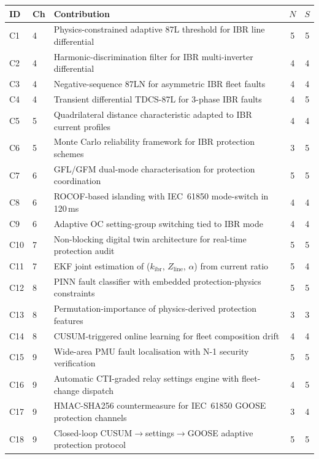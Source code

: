 \documentclass[11pt,a4paper]{article}
\begin{document}
\begin{center}
\small
\begin{tabular}{@{}llp{8cm}cc@{}}
\toprule
ID & Ch & Contribution & $N$ & $S$ \\
\midrule
C1  & 4 & Physics-constrained adaptive 87L threshold for IBR line differential & 5 & 5 \\
C2  & 4 & Harmonic-discrimination filter for IBR multi-inverter differential    & 4 & 4 \\
C3  & 4 & Negative-sequence 87LN for asymmetric IBR fleet faults                & 4 & 4 \\
C4  & 4 & Transient differential TDCS-87L for 3-phase IBR faults                & 4 & 5 \\
C5  & 5 & Quadrilateral distance characteristic adapted to IBR current profiles  & 4 & 4 \\
C6  & 5 & Monte Carlo reliability framework for IBR protection schemes           & 3 & 5 \\
C7  & 6 & GFL/GFM dual-mode characterisation for protection coordination         & 5 & 5 \\
C8  & 6 & ROCOF-based islanding with IEC~61850 mode-switch in 120\,ms           & 4 & 4 \\
C9  & 6 & Adaptive OC setting-group switching tied to IBR mode                   & 4 & 4 \\
C10 & 7 & Non-blocking digital twin architecture for real-time protection audit   & 5 & 5 \\
C11 & 7 & EKF joint estimation of ($k_\mathrm{ibr}$, $Z_\mathrm{line}$, $\alpha$) from current ratio & 5 & 4 \\
C12 & 8 & PINN fault classifier with embedded protection-physics constraints      & 5 & 5 \\
C13 & 8 & Permutation-importance of physics-derived protection features           & 3 & 3 \\
C14 & 8 & CUSUM-triggered online learning for fleet composition drift             & 4 & 4 \\
C15 & 9 & Wide-area PMU fault localisation with N-1 security verification        & 5 & 5 \\
C16 & 9 & Automatic CTI-graded relay settings engine with fleet-change dispatch   & 4 & 5 \\
C17 & 9 & HMAC-SHA256 countermeasure for IEC~61850 GOOSE protection channels     & 3 & 4 \\
C18 & 9 & Closed-loop CUSUM$\to$settings$\to$GOOSE adaptive protection protocol  & 5 & 5 \\
\bottomrule
\end{tabular}
\end{center}
\end{document}
